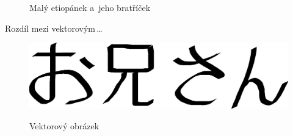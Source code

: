 \documentclass[11pt, a4paper, titlepage] {article}
\begin{document}
\begin{figure}[ht]
\begin{center}
{	
	}
\caption{Malý etiopánek a~jeho bratříček}
\label{etiopan}
\end{center}
\end{figure}
\newpage

Rozdíl mezi vektorovým\,\ldots

\begin{figure}[ht]
\begin{center}
{
	\includegraphics[scale=0.4]{oniisan.eps}
}
\caption{Vektorový obrázek}
\label{oniisan}
\end{center}
\end{figure}
\end{document}
